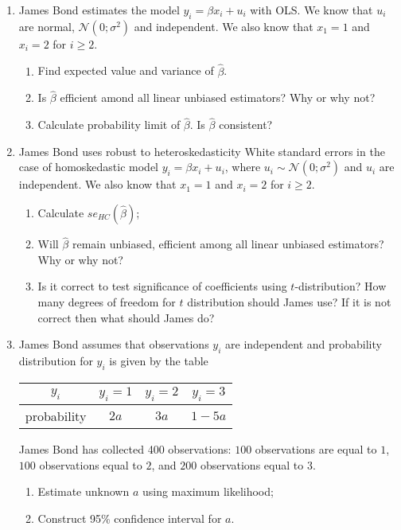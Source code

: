\documentclass[12pt]{article}
\def \cN{\mathcal{N}}
\begin{document}
\begin{enumerate}

	\item James Bond estimates the model $y_i = \beta x_i + u_i$ with OLS.
	We know that $u_i$ are normal, $\cN(0; \sigma^2)$ and independent.
	We also know that $x_1 = 1$ and $x_i = 2$ for $i\geq 2$.
	    \begin{enumerate}
      \item Find expected value and variance of $\hat \beta$.
      \item Is $\hat \beta$ efficient amond all linear unbiased estimators? Why or why not?
			\item Calculate probability limit of $\hat \beta$. Is $\hat \beta$ consistent?
    \end{enumerate}

  \item James Bond uses robust to heteroskedasticity White standard errors
	in the case of homoskedastic model $y_i = \beta x_i + u_i$, where
	$u_i \sim \cN(0; \sigma^2)$ and $u_i$ are independent.
	We also know that $x_1 = 1$ and $x_i = 2$ for $i\geq 2$.
 \begin{enumerate}
	 \item Calculate $se_{HC}(\hat\beta)$;
 	  \item Will $\hat \beta$ remain unbiased, efficient among all linear unbiased estimators? Why or why not?
		\item Is it correct to test significance of coefficients using $t$-distribution? How many degrees of freedom for $t$ distribution should James use? If it is not correct then what should James do?
 \end{enumerate}

 \item James Bond assumes that observations $y_i$ are independent and probability distribution for $y_i$ is given by the table

	 \begin{tabular}{cccc}
		 \toprule
		 $y_i$ & $y_i = 1$ & $y_i = 2$ & $y_i = 3$ \\
		 \midrule
		 probability & $2a$ & $3a$ & $1 - 5a$ \\
		 \bottomrule
	 \end{tabular}

	 James Bond has collected 400 observations: $100$ observations are equal to $1$, $100$ observations equal to $2$, and $200$ observations equal to $3$.

\begin{enumerate}
 \item Estimate unknown $a$ using maximum likelihood;
 \item Construct 95\% confidence interval for $a$.
\end{enumerate}



\end{enumerate}
\end{document}
